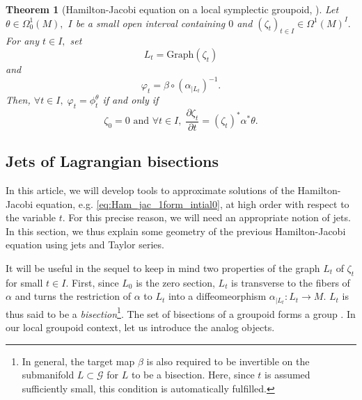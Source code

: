 \documentclass[a4paper,11pt]{article}
\newcommand{\Graph}{\text{Graph}}
\newtheorem{theorem}{Theorem}[section]
\def\ts{\thinspace}
\begin{document}
\begin{theorem}[Hamilton-Jacobi equation on a local symplectic groupoid, \cite{oscar}]\label{thm:Ham_jac}
Let $\theta \in \Omega_0^1(M),$ $I$ be a small open interval containing $0$ and $(\zeta_t)_{t \in I} \in \Omega^1(M)^{I}.$ For any $t \in I,$ set 
\begin{equation}\label{eq:Lt_zetat}
L_t = \Graph(\zeta_t)
\end{equation}
and 
\begin{equation}\label{eq:diff_bislag}
\varphi_t = \beta \circ (\alpha_{|L_t})^{-1}.
\end{equation}
Then, $\forall t \in I, \; \varphi_t = \phi^{\theta}_t$ if and only if
\begin{equation}
\label{eq:Ham_jac_1form_intial0}
\zeta_0 = 0 \text{ and } \forall t \in I, \; 
\frac{\partial \zeta_t}{\partial t} = (\zeta_t)^*\alpha^*\theta.
\end{equation}
\end{theorem}

\subsection{Jets of Lagrangian bisections}\label{sec:jets_bislag}

In this article, we will develop tools to approximate solutions of the Hamilton-Jacobi equation, e.g. \eqref{eq:Ham_jac_1form_intial0}, at high order with respect to the variable $t$. For this precise reason, we will need an appropriate notion of jets. In this section, we thus explain some geometry of the previous Hamilton-Jacobi equation using jets and Taylor series. 

It will be useful in the sequel to keep in mind two properties of the graph $L_t$ of $\zeta_t$ for small $t \in I.$ First, since $L_0$ is the zero section, $L_t$ is transverse to the fibers of $\alpha$ and turns the restriction of $\alpha$ to $L_t$ into a diffeomeorphism $\alpha_{|L_t} \colon L_t \to M.$ $L_t$ is thus said to be a \textit{bisection}\footnote{In general, the target map $\beta$ is also required to be invertible on the submanifold $L \subset \mathcal{G}$ for $L$ to be a bisection. Here, since $t$ is assumed sufficiently small, this condition is automatically fulfilled.}. The set of bisections of a groupoid forms a group \cite[Sec.\ts 15.2]{dSW}. In our local groupoid context, let us introduce the analog objects. 
\end{document}
